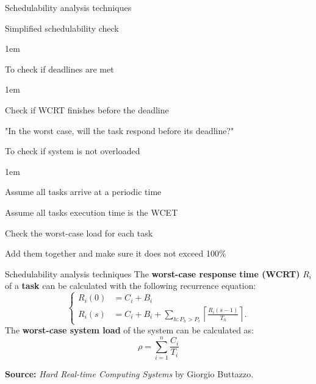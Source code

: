 \begin{frame}{Schedulability analysis techniques}
    \begin{block}{Simplified schedulability check}
        \begin{itemize-size}{1em}
            \item To check if deadlines are met
            \begin{itemize-size}{1em}
                \item Check if WCRT finishes before the deadline
                \item "In the worst case, will the task respond before its deadline?"
            \end{itemize-size}
            \item To check if system is not overloaded
            \begin{itemize-size}{1em}
                \item Assume all tasks arrive at a periodic time 
                \item Assume all tasks execution time is the WCET
                \item Check the worst-case load for each task
                \item Add them together and make sure it does not exceed 100\%
            \end{itemize-size}
        \end{itemize-size} 
    \end{block}
\end{frame}

\begin{frame}{Schedulability analysis techniques}
    The \textbf{worst-case response time (WCRT)} $R_i$ of a \textbf{task} can be calculated with
    the following recurrence equation:
    \begin{equation}
        \begin{cases}
            R_{i}(0) &= C_i + B_i \\
            R_{i}(s) &= C_i + B_i + \sum\limits_{h: P_h > P_i} \left\lceil \frac{R_{i}(s-1)}{T_h} \right\rceil.
        \end{cases}
    \end{equation}
    The \textbf{worst-case system load} of the system can be calculated as:
    \begin{equation}
        \rho = \sum^{n}_{i=1} \frac{C_i}{T_i}
    \end{equation}

    \textbf{Source:} \emph{Hard Real-time Computing Systems} by Giorgio Buttazzo.
\end{frame}


